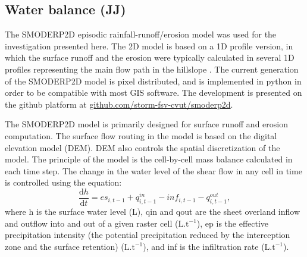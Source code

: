     \subsection{Water balance (JJ)}

    The SMODERP2D episodic rainfall-runoff/erosion model was used for the
    investigation presented here. The 2D model is based on a 1D profile version, in
    which the surface runoff and the erosion were typically calculated in several
    1D profiles representing the main flow path in the hillslope \cite{Dostal2000}.
    The current generation of the SMODERP2D model is pixel distributed, and is
    implemented in python in order to be compatible with most GIS software. The
    development is presented on the github platform at
    \href{https://github.com/storm-fsv-cvut/smoderp2d}{github.com/storm-fsv-cvut/smoderp2d}.

    The SMODERP2D model is primarily designed for surface runoff and erosion
    computation. The surface flow routing in the model is based on the digital
    elevation model (DEM). DEM also controls the spatial discretization of the
    model. The principle of the model is the cell-by-cell mass balance calculated
    in each time step. The change in the water level of the shear flow in any cell
    in time is controlled using the equation: 
    \begin{equation} 
    \frac{\mathrm{d}h}{\mathrm{d}t} = es_{i,t-1} + q^{in}_{i,t-1} - inf_{i,t-1} - q^{out}_{i,t-1},
    \label{eq:bilance}
    \end{equation}
    where h is the surface water level (L), qin and qout are the sheet overland
    inflow and outflow into and out of a given raster cell ($\mathrm{L.t^{-1}}$),
    ep is the effective precipitation intensity (the potential precipitation
    reduced by the interception zone and the surface retention)
    ($\mathrm{L.t^{-1}}$), and inf is the infiltration rate ($\mathrm{L.t^{-1}}$).


